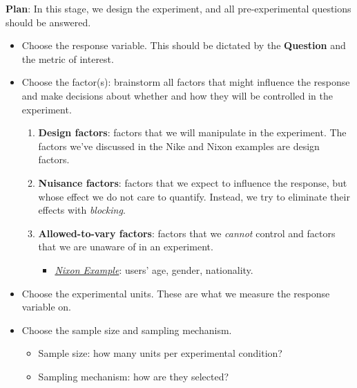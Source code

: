 \begin{framed}
    \textbf{Plan}: In this stage, we design the experiment, and all pre-experimental questions
    should be answered.
    \begin{itemize}
        \item Choose the response variable. This should be dictated by the \textbf{Question} and the metric
              of interest.
        \item Choose the factor(s): brainstorm all factors that might influence the response and make
              decisions about whether and how they will be controlled in the experiment.
              \begin{enumerate}[i]
                  \item \textbf{Design factors}: factors that we will manipulate in the experiment.
                        The factors we've discussed in the Nike and Nixon examples are design factors.
                  \item \textbf{Nuisance factors}: factors that we expect to influence
                        the response, but whose effect we do not care to quantify. Instead, we try to eliminate
                        their effects with \emph{blocking}.
                  \item \textbf{Allowed-to-vary factors}: factors that we \emph{cannot} control and factors that
                        we are unaware of in an experiment.
                        \begin{itemize}
                            \item \emph{\hyperref[ex:nixon_ex]{Nixon Example}}:
                                  users' age, gender, nationality.
                        \end{itemize}
              \end{enumerate}
        \item Choose the experimental units. These are what we measure the response variable on.
        \item Choose the sample size and sampling mechanism.
              \begin{itemize}
                  \item Sample size: how many units per experimental condition?
                  \item Sampling mechanism: how are they selected?
              \end{itemize}
    \end{itemize}
\end{framed}
